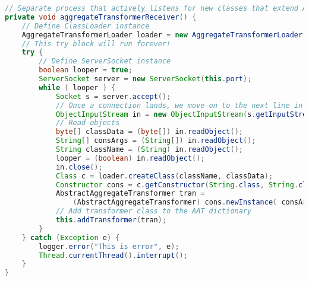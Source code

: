 \begin{lstlisting}[language=Java, caption={Funksjon i Migrator som kjøres i separat tråd.}]
// Separate process that actively listens for new classes that extend AAT
private void aggregateTransformerReceiver() {
    // Define ClassLoader instance
    AggregateTransformerLoader loader = new AggregateTransformerLoader();
    // This try block will run forever!
    try {
        // Define ServerSocket instance
        boolean looper = true;
        ServerSocket server = new ServerSocket(this.port);
        while ( looper ) {
            Socket s = server.accept();
            // Once a connection lands, we move on to the next line in this program
            ObjectInputStream in = new ObjectInputStream(s.getInputStream());
            // Read objects
            byte[] classData = (byte[]) in.readObject();
            String[] consArgs = (String[]) in.readObject();
            String className = (String) in.readObject();
            looper = (boolean) in.readObject();
            in.close();
            Class c = loader.createClass(className, classData);
            Constructor cons = c.getConstructor(String.class, String.class);
            AbstractAggregateTransformer tran =
                (AbstractAggregateTransformer) cons.newInstance( consArgs[0], consArgs[1] );
            // Add transformer class to the AAT dictionary
            this.addTransformer(tran);
        }
    } catch (Exception e) {
        logger.error("This is error", e);
        Thread.currentThread().interrupt();
    }
}
\end{lstlisting}
